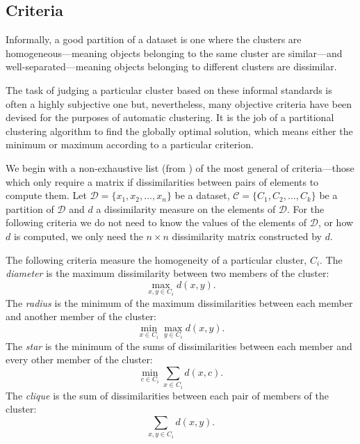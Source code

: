 \documentclass[a4paper]{report}
\newcommand{\dset}{\mathcal{D}}
\newcommand{\clus}{\mathcal{C}}
\begin{document}
\subsection{Criteria}
\label{sec:criteria}

Informally, a good partition of a dataset is one where the clusters are
homogeneous---meaning objects belonging to the same cluster are similar---and
well-separated---meaning objects belonging to different clusters are
dissimilar.

The task of judging a particular cluster based on these informal standards is
often a highly subjective one but, nevertheless, many objective criteria have
been devised for the purposes of automatic clustering.  It is the job of a
partitional clustering algorithm to find the globally optimal solution, which
means either the minimum or maximum according to a particular criterion.

We begin with a non-exhaustive list (from \citep{hansen1997mathprog}) of the
most general of criteria---those which only require a matrix if
dissimilarities between pairs of elements to compute them.  Let $\dset =
\{x_1,x_2,\dotsc,x_n\}$ be a dataset, $\clus = \{C_1,C_2,\dotsc,C_k\}$ be a
partition of $\dset$ and $d$ a dissimilarity measure on the elements of
$\dset$.  For the following criteria we do not need to know the values of the
elements of $\dset$, or how $d$ is computed, we only need the $n \times n$
dissimilarity matrix constructed by $d$.

The following criteria measure the homogeneity of a particular cluster, $C_i$.
The \textit{diameter} is the maximum dissimilarity between two members of the
cluster:
\begin{equation*}
  \max_{x,y \in C_i} d(x,y).
\end{equation*}
The \textit{radius} is the minimum of the maximum dissimilarities between each
member and another member of the cluster:
\begin{equation*}
  \min_{x \in C_i} \max_{y \in C_i} d(x,y).
\end{equation*}
The \textit{star} is the minimum of the sums of dissimilarities between each
member and every other member of the cluster:
\begin{equation*}
  \min_{c \in C_i} \sum_{x \in C_i} d(x,c).
\end{equation*}
The \textit{clique} is the sum of dissimilarities between each pair of members
of the cluster:
\begin{equation*}
  \sum_{x,y \in C_i} d(x,y).
\end{equation*}
\end{document}
